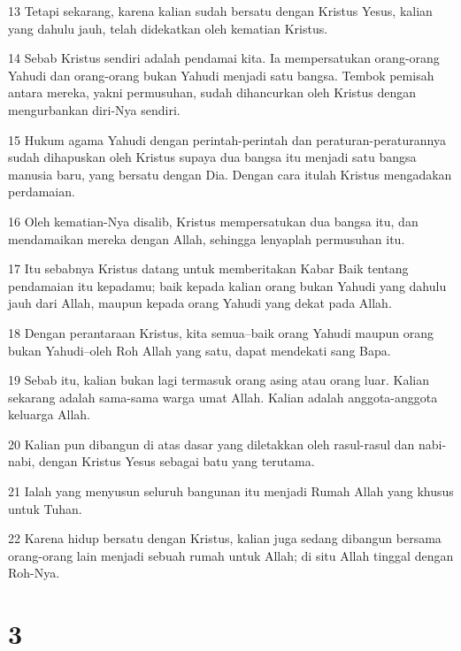 \par 13 Tetapi sekarang, karena kalian sudah bersatu dengan Kristus Yesus, kalian yang dahulu jauh, telah didekatkan oleh kematian Kristus.
\par 14 Sebab Kristus sendiri adalah pendamai kita. Ia mempersatukan orang-orang Yahudi dan orang-orang bukan Yahudi menjadi satu bangsa. Tembok pemisah antara mereka, yakni permusuhan, sudah dihancurkan oleh Kristus dengan mengurbankan diri-Nya sendiri.
\par 15 Hukum agama Yahudi dengan perintah-perintah dan peraturan-peraturannya sudah dihapuskan oleh Kristus supaya dua bangsa itu menjadi satu bangsa manusia baru, yang bersatu dengan Dia. Dengan cara itulah Kristus mengadakan perdamaian.
\par 16 Oleh kematian-Nya disalib, Kristus mempersatukan dua bangsa itu, dan mendamaikan mereka dengan Allah, sehingga lenyaplah permusuhan itu.
\par 17 Itu sebabnya Kristus datang untuk memberitakan Kabar Baik tentang pendamaian itu kepadamu; baik kepada kalian orang bukan Yahudi yang dahulu jauh dari Allah, maupun kepada orang Yahudi yang dekat pada Allah.
\par 18 Dengan perantaraan Kristus, kita semua--baik orang Yahudi maupun orang bukan Yahudi--oleh Roh Allah yang satu, dapat mendekati sang Bapa.
\par 19 Sebab itu, kalian bukan lagi termasuk orang asing atau orang luar. Kalian sekarang adalah sama-sama warga umat Allah. Kalian adalah anggota-anggota keluarga Allah.
\par 20 Kalian pun dibangun di atas dasar yang diletakkan oleh rasul-rasul dan nabi-nabi, dengan Kristus Yesus sebagai batu yang terutama.
\par 21 Ialah yang menyusun seluruh bangunan itu menjadi Rumah Allah yang khusus untuk Tuhan.
\par 22 Karena hidup bersatu dengan Kristus, kalian juga sedang dibangun bersama orang-orang lain menjadi sebuah rumah untuk Allah; di situ Allah tinggal dengan Roh-Nya.

\chapter{3}

